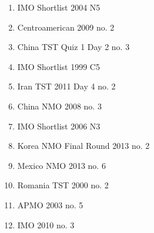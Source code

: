 \documentclass{article}
\begin{document}
	\begin{enumerate}
		\item IMO Shortlist 2004 N5
		\item Centroamerican 2009 no. 2
		\item China TST Quiz 1 Day 2 no. 3
		\item IMO Shortlist 1999 C5
		\item Iran TST 2011 Day 4 no. 2
		\item China NMO 2008 no. 3
		\item IMO Shortlist 2006 N3
		\item Korea NMO Final Round 2013 no. 2
		\item Mexico NMO 2013 no. 6
		\item Romania TST 2000 no. 2
		\item APMO 2003 no. 5
		\item IMO 2010 no. 3
	\end{enumerate}
\end{document}
